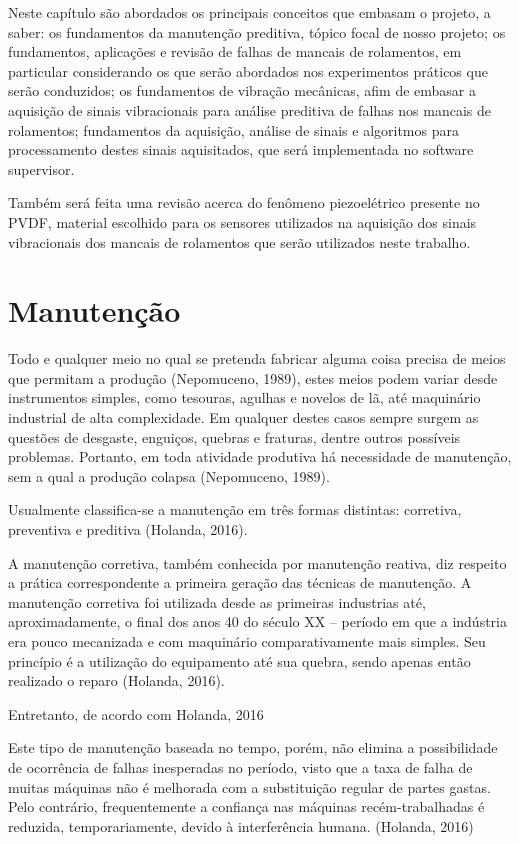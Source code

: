 \documentclass[
	12pt,				
	oneside,			
	a4paper,			
	english,			
	brazil				
	]{abntex2ppgsi}
\begin{document}
Neste capítulo são abordados os principais conceitos que embasam o projeto, a saber: os fundamentos da manutenção preditiva, tópico focal de nosso projeto; os fundamentos, aplicações e revisão de falhas de mancais de rolamentos, em particular considerando os que serão abordados nos experimentos práticos que serão conduzidos; os fundamentos de vibração mecânicas, afim de embasar a aquisição de sinais vibracionais para análise preditiva de falhas nos mancais de rolamentos; fundamentos da aquisição, análise de sinais e algoritmos para processamento destes sinais aquisitados, que será implementada no software supervisor.

Também será feita uma revisão acerca do fenômeno piezoelétrico presente no PVDF, material escolhido para os sensores utilizados na aquisição dos sinais vibracionais dos mancais de rolamentos que serão utilizados neste trabalho. 


\section{\textbf{Manutenção}}
Todo e qualquer meio no qual se pretenda fabricar alguma coisa precisa de meios que permitam a produção (Nepomuceno, 1989), estes meios podem variar desde instrumentos simples, como tesouras, agulhas e novelos de lã, até maquinário industrial de alta complexidade. Em qualquer destes casos sempre surgem as questões de desgaste, enguiços, quebras e fraturas, dentre outros possíveis problemas. Portanto, em toda atividade produtiva  há necessidade de manutenção, sem a qual a produção colapsa (Nepomuceno, 1989).

	Usualmente classifica-se a manutenção em três formas distintas: corretiva, preventiva e preditiva (Holanda, 2016). 

	A manutenção corretiva, também conhecida por manutenção reativa, diz respeito a prática correspondente a primeira geração das técnicas de manutenção. A manutenção corretiva foi utilizada desde as primeiras industrias até, aproximadamente, o final dos anos 40 do século XX – período em que a indústria era pouco mecanizada e com maquinário comparativamente mais simples. Seu princípio é a utilização do equipamento até sua quebra, sendo apenas então realizado o reparo (Holanda, 2016). 
	
	Entretanto, de acordo com Holanda, 2016	

\begin{citacao}

	Este tipo de manutenção baseada no tempo, porém, não elimina a possibilidade de ocorrência de falhas inesperadas no período, visto que a taxa de falha de 	muitas máquinas não é melhorada com a substituição regular de partes gastas. Pelo contrário, frequentemente a confiança nas máquinas recém-trabalhadas é 		reduzida, temporariamente, devido à interferência humana. (Holanda, 2016)

\end{citacao}
\end{document}
